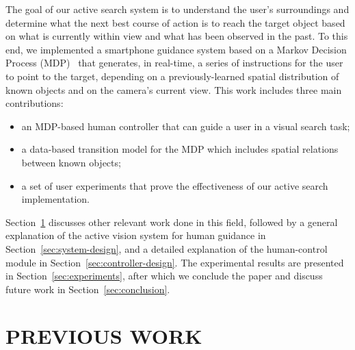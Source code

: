 \documentclass[a4paper, twoside]{article}
\begin{document}
The goal of our active search system is to understand the user's surroundings and determine what the next best course of action is to reach the target object based on what is currently within view and what has been observed in the past. To this end, we implemented a smartphone guidance system based on a Markov Decision Process (MDP)~\cite{bellman1957markovian} that generates, in real-time, a series of instructions for the user to point to the target, depending on a previously-learned spatial distribution of known objects and on the camera's current view.  
%
This work includes three main contributions:

\begin{itemize}
  \item an MDP-based human controller that can guide a user in a visual search task;
  \item a data-based transition model for the MDP which includes spatial relations between known objects;
  \item a set of user experiments that prove the effectiveness of our active search implementation.
\end{itemize}


Section~\ref{sec:previous-work} discusses other relevant work done in this field, followed by a general explanation of the active vision system for human guidance in Section~\ref{sec:system-design}, and a detailed explanation of the human-control module in Section~\ref{sec:controller-design}. The experimental results are presented in Section~\ref{sec:experiments}, after which we conclude the paper and discuss future work in Section~\ref{sec:conclusion}. 

\section{\uppercase{Previous Work}}\label{sec:previous-work}
\end{document}
